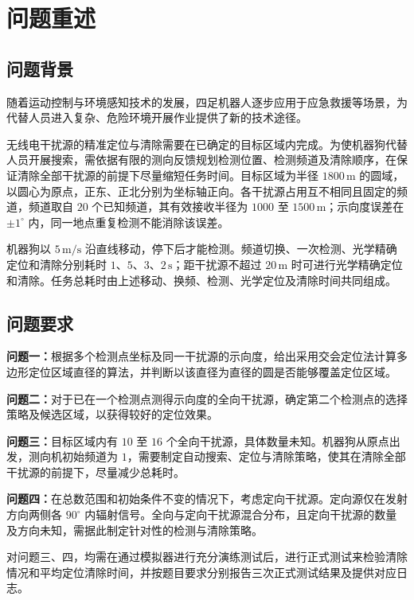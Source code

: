 \section{问题重述}\label{sec:problem-restatement}
\subsection{问题背景}

随着运动控制与环境感知技术的发展，四足机器人逐步应用于应急救援等场景，为代替人员进入复杂、危险环境开展作业提供了新的技术途径\cite{unitree-rescue}。

无线电干扰源的精准定位与清除需要在已确定的目标区域内完成。为使机器狗代替人员开展搜索，需依据有限的测向反馈规划检测位置、检测频道及清除顺序，在保证清除全部干扰源的前提下尽量缩短任务时间。目标区域为半径 $1800\,\mathrm{m}$ 的圆域，以圆心为原点，正东、正北分别为坐标轴正向。各干扰源占用互不相同且固定的频道，频道取自 $20$ 个已知频道，其有效接收半径为 $1000$ 至 $1500\,\mathrm{m}$；示向度误差在 $\pm1^\circ$ 内，同一地点重复检测不能消除该误差。

机器狗以 $5\,\mathrm{m/s}$ 沿直线移动，停下后才能检测。频道切换、一次检测、光学精确定位和清除分别耗时 $1$、$5$、$3$、$2\,\mathrm{s}$；距干扰源不超过 $20\,\mathrm{m}$ 时可进行光学精确定位和清除。任务总耗时由上述移动、换频、检测、光学定位及清除时间共同组成。

\subsection{问题要求}

\textbf{问题一：}根据多个检测点坐标及同一干扰源的示向度，给出采用交会定位法计算多边形定位区域直径的算法，并判断以该直径为直径的圆是否能够覆盖定位区域。

\textbf{问题二：}对于已在一个检测点测得示向度的全向干扰源，确定第二个检测点的选择策略及候选区域，以获得较好的定位效果。

\textbf{问题三：}目标区域内有 $10$ 至 $16$ 个全向干扰源，具体数量未知。机器狗从原点出发，测向机初始频道为 $1$，需要制定自动搜索、定位与清除策略，使其在清除全部干扰源的前提下，尽量减少总耗时。

\textbf{问题四：}在总数范围和初始条件不变的情况下，考虑定向干扰源。定向源仅在发射方向两侧各 $90^\circ$ 内辐射信号。全向与定向干扰源混合分布，且定向干扰源的数量及方向未知，需据此制定针对性的检测与清除策略。

对问题三、四，均需在通过模拟器进行充分演练测试后，进行正式测试来检验清除情况和平均定位清除时间，并按题目要求分别报告三次正式测试结果及提供对应日志。
